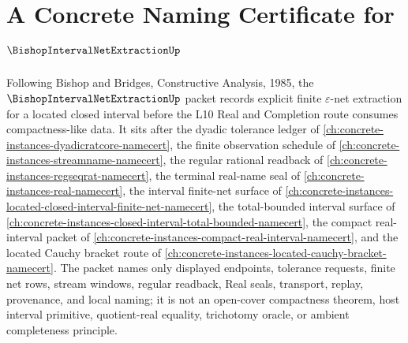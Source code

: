 \chapter{A Concrete Naming Certificate for $\BishopIntervalNetExtractionUp$}
\label{ch:concrete-instances-bishop-interval-net-extraction-namecert}

Following Bishop and Bridges, Constructive Analysis, 1985, the $\BishopIntervalNetExtractionUp$ packet records explicit finite $\varepsilon$-net extraction for a located closed interval before the L10 Real and Completion route consumes compactness-like data. It sits after the dyadic tolerance ledger of \autoref{ch:concrete-instances-dyadicratcore-namecert}, the finite observation schedule of \autoref{ch:concrete-instances-streamname-namecert}, the regular rational readback of \autoref{ch:concrete-instances-regseqrat-namecert}, the terminal real-name seal of \autoref{ch:concrete-instances-real-namecert}, the interval finite-net surface of \autoref{ch:concrete-instances-located-closed-interval-finite-net-namecert}, the total-bounded interval surface of \autoref{ch:concrete-instances-closed-interval-total-bounded-namecert}, the compact real-interval packet of \autoref{ch:concrete-instances-compact-real-interval-namecert}, and the located Cauchy bracket route of \autoref{ch:concrete-instances-located-cauchy-bracket-namecert}. The packet names only displayed endpoints, tolerance requests, finite net rows, stream windows, regular readback, Real seals, transport, replay, provenance, and local naming; it is not an open-cover compactness theorem, host interval primitive, quotient-real equality, trichotomy oracle, or ambient completeness principle.

